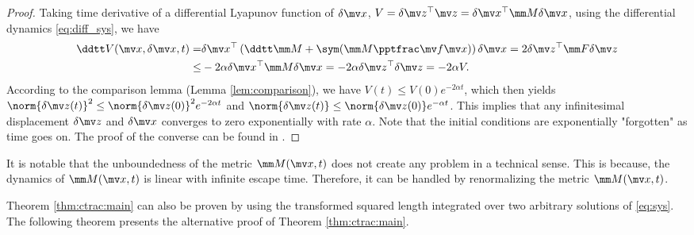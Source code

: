 \begin{proof}
    Taking time derivative of a differential Lyapunov function of $\delta\bdx$, $V=\delta\bdz^\top\bdz=\delta\bdx^\top\mm M\delta\bdx$, using the differential dynamics \eqref{eq:diff_sys}, we have
    \begin{equation}
        \begin{aligned}
            \ddtt V (\bdx, \delta\bdx, t)
            =&
            \delta\bdx^\top
            \left(
                \ddtt\mm M
                +
                \sym(\mm M\tpfpx)
            \right)
            \delta\bdx
            =
            2
            \delta\bdz^\top
            \mm F
            \delta \bdz
            \\
            \le&
            -2\alpha
            \delta\bdx^\top
            \mm M
            \delta\bdx
            =
            -
            2\alpha
            \delta\bdz^\top
            \delta\bdz
            =
            -2\alpha V
            .
        \end{aligned}
    \end{equation}
    According to the comparison lemma (Lemma \ref{lem:comparison}), we have $V(t)\le V(0)e^{-2\alpha t}$, which then yields $\norm{\delta\bdz(t)}^2\le\norm{\delta\bdz(0)}^2e^{-2\alpha t}$ and $\norm{\delta\bdz(t)}\le\norm{\delta\bdz(0)}e^{-\alpha t}$.
    This implies that any infinitesimal displacement $\delta\bdz$ and $\delta\bdx$ converges to zero exponentially with rate $\alpha$.
    Note that the initial conditions are exponentially "forgotten" as time goes on.
    The proof of the converse can be found in \cite[Sec. 3.5]{LOHMILLER:1998aa}.
\end{proof}

It is notable that the unboundedness of the metric $\mm M(\bdx, t)$ does not create any problem in a technical sense.
This is because, the dynamics of $\mm M(\bdx, t)$ is linear with infinite escape time.
Therefore, it can be handled by renormalizing the metric $\mm M(\bdx, t)$.

\hfill

Theorem \ref{thm:ctrac:main} can also be proven by using the transformed squared length integrated over two arbitrary solutions of \eqref{eq:sys}.
The following theorem presents the alternative proof of Theorem \ref{thm:ctrac:main}.

